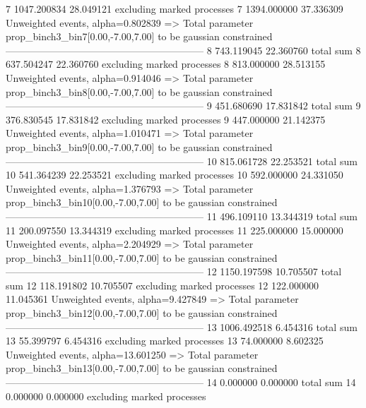 7          1047.200834     28.049121       excluding marked processes    
7          1394.000000     37.336309       Unweighted events, alpha=0.802839
  => Total parameter prop_binch3_bin7[0.00,-7.00,7.00] to be gaussian constrained
------------------------------------------------------------
8          743.119045      22.360760       total sum                     
8          637.504247      22.360760       excluding marked processes    
8          813.000000      28.513155       Unweighted events, alpha=0.914046
  => Total parameter prop_binch3_bin8[0.00,-7.00,7.00] to be gaussian constrained
------------------------------------------------------------
9          451.680690      17.831842       total sum                     
9          376.830545      17.831842       excluding marked processes    
9          447.000000      21.142375       Unweighted events, alpha=1.010471
  => Total parameter prop_binch3_bin9[0.00,-7.00,7.00] to be gaussian constrained
------------------------------------------------------------
10         815.061728      22.253521       total sum                     
10         541.364239      22.253521       excluding marked processes    
10         592.000000      24.331050       Unweighted events, alpha=1.376793
  => Total parameter prop_binch3_bin10[0.00,-7.00,7.00] to be gaussian constrained
------------------------------------------------------------
11         496.109110      13.344319       total sum                     
11         200.097550      13.344319       excluding marked processes    
11         225.000000      15.000000       Unweighted events, alpha=2.204929
  => Total parameter prop_binch3_bin11[0.00,-7.00,7.00] to be gaussian constrained
------------------------------------------------------------
12         1150.197598     10.705507       total sum                     
12         118.191802      10.705507       excluding marked processes    
12         122.000000      11.045361       Unweighted events, alpha=9.427849
  => Total parameter prop_binch3_bin12[0.00,-7.00,7.00] to be gaussian constrained
------------------------------------------------------------
13         1006.492518     6.454316        total sum                     
13         55.399797       6.454316        excluding marked processes    
13         74.000000       8.602325        Unweighted events, alpha=13.601250
  => Total parameter prop_binch3_bin13[0.00,-7.00,7.00] to be gaussian constrained
------------------------------------------------------------
14         0.000000        0.000000        total sum                     
14         0.000000        0.000000        excluding marked processes    
